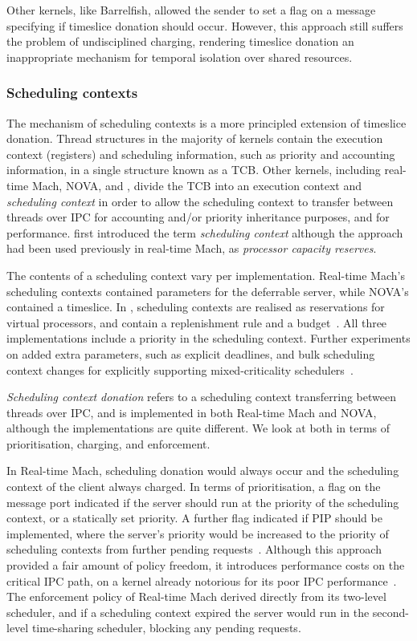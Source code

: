 Other kernels, like Barrelfish, allowed the sender to set a flag on a message specifying if
timeslice donation should occur. However, this approach still suffers the problem of undisciplined 
charging, rendering timeslice donation an inappropriate mechanism for temporal isolation over
shared resources.

\subsubsection{Scheduling contexts}
\label{s:sc-intro}

The mechanism of scheduling contexts is a more principled extension of timeslice donation.
Thread structures in the majority of kernels contain the execution context (registers) and scheduling
information, such as priority and accounting information, in a single structure known as a \gls{TCB}.
Other kernels, including real-time Mach, NOVA, and \fiascooc, divide the TCB into an execution context and
\emph{scheduling context} in order to allow the scheduling context to
transfer between threads over \gls{IPC} for accounting and/or priority inheritance purposes, and for
performance. \citet{Steinberg_WH_05} first introduced the term \emph{scheduling context} although the
approach had been used previously in real-time Mach, as \emph{processor capacity reserves}.

The contents of a scheduling context vary per implementation.
Real-time Mach's scheduling contexts contained parameters for the deferrable
server, while NOVA's contained a timeslice. In \fiascooc, scheduling contexts are realised as
reservations for virtual processors, and contain a
replenishment rule and a budget~\citep{Lackorzynski_WVH_12}.
All three implementations include a priority in the
scheduling context. Further experiments on \fiascooc added extra parameters, such as explicit
deadlines, and bulk scheduling context changes for explicitly supporting mixed-criticality
schedulers~\citep{Volp_LH_13}.

\emph{Scheduling context donation} refers to a scheduling context transferring between threads over
\gls{IPC}, and is implemented in both Real-time Mach and NOVA, although the implementations are
quite different. We look at both in terms of prioritisation, charging, and enforcement. 

In Real-time Mach, scheduling donation would always occur and the scheduling context of the client
always charged. In terms of prioritisation, a flag on the message port
indicated if the server should run at the priority of the scheduling context, or a statically set
priority. A further flag indicated if \gls{PIP} should be implemented, where the server's priority
would be increased to the priority of scheduling contexts from further pending requests~\citep{Kitayama_NT_93}. Although this approach provided a fair amount of policy freedom, it introduces performance costs on the 
critical \gls{IPC} path, on a kernel already notorious for its poor \gls{IPC}
performance~\citep{Hartig_HLSW_97}. 
The enforcement policy of Real-time Mach derived directly from its two-level scheduler, and if a
scheduling context expired the server would run in the second-level time-sharing scheduler, blocking
any pending requests.

